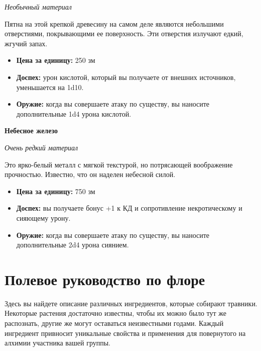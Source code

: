 \documentclass[a4paper, 9pt, twocolumn]{book}
\begin{document}
	\noindent \textit{Необычный материал}
	
	\smallskip
	
	\noindent Пятна на этой крепкой древесину на самом деле являются небольшими отверстиями, покрывающими ее поверхность. Эти отверстия излучают едкий, жгучий запах.
	
	\begin{itemize}
		\item \textbf{Цена за единицу:} 250 зм
		
		\item \textbf{Доспех:} урон кислотой, который вы получаете от внешних источников, уменьшается на 1d10.
		
		\item \textbf{Оружие:} когда вы совершаете атаку по существу, вы наносите дополнительные 1d4 урона кислотой.
	\end{itemize}

	\noindent \textbf{Небесное железо}
	
	\noindent \textit{Очень редкий материал}
	
	\smallskip
	
	\noindent Это ярко-белый металл с мягкой текстурой, но потрясающей воображение прочностью. Известно, что он наделен небесной силой.
	
	\begin{itemize}
		\item \textbf{Цена за единицу:} 750 зм
		
		\item \textbf{Доспех:} вы получаете бонус +1 к КД и сопротивление некротическому и сияющему урону. %
		
		\item \textbf{Оружие:} когда вы совершаете атаку по существу, вы наносите дополнительные 2d4 урона сиянием.
	\end{itemize}

	\chapter{Полевое руководство по флоре}
	
	Здесь вы найдете описание различных ингредиентов, которые собирают травники. Некоторые растения достаточно известны, чтобы их можно было тут же распознать, другие же могут оставаться неизвестными годами. Каждый ингредиент привносит уникальные свойства и применения для повернутого на алхимии участника вашей группы.
	
	\bigskip
	
\end{document}
